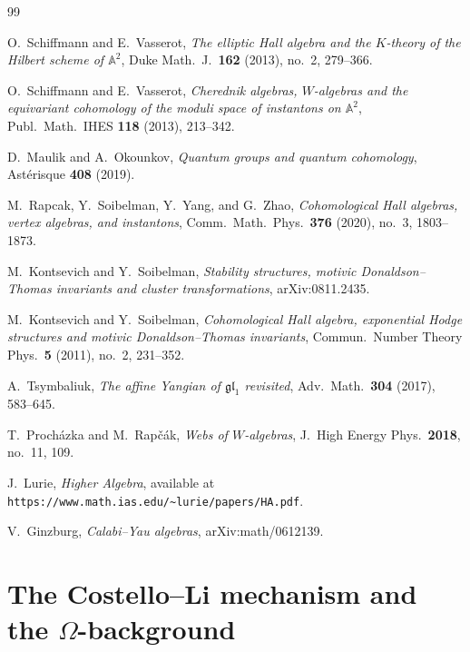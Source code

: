 \documentclass[11pt]{article}
\theoremstyle{definition}
\theoremstyle{remark}
\begin{document}

\begin{thebibliography}{99}

O.~Schiffmann and E.~Vasserot,
\emph{The elliptic Hall algebra and the $K$-theory of the Hilbert scheme of $\mathbb{A}^2$},
Duke Math.\ J.\ \textbf{162} (2013), no.~2, 279--366.

O.~Schiffmann and E.~Vasserot,
\emph{Cherednik algebras, $W$-algebras and the equivariant cohomology of the moduli space of instantons on $\mathbb{A}^2$},
Publ.\ Math.\ IHES \textbf{118} (2013), 213--342.

D.~Maulik and A.~Okounkov,
\emph{Quantum groups and quantum cohomology},
Ast\'erisque \textbf{408} (2019).

M.~Rapcak, Y.~Soibelman, Y.~Yang, and G.~Zhao,
\emph{Cohomological Hall algebras, vertex algebras, and instantons},
Comm.\ Math.\ Phys.\ \textbf{376} (2020), no.~3, 1803--1873.

M.~Kontsevich and Y.~Soibelman,
\emph{Stability structures, motivic Donaldson--Thomas invariants and cluster transformations},
arXiv:0811.2435.

M.~Kontsevich and Y.~Soibelman,
\emph{Cohomological Hall algebra, exponential Hodge structures and motivic Donaldson--Thomas invariants},
Commun.\ Number Theory Phys.\ \textbf{5} (2011), no.~2, 231--352.

A.~Tsymbaliuk,
\emph{The affine Yangian of $\mathfrak{gl}_1$ revisited},
Adv.\ Math.\ \textbf{304} (2017), 583--645.

T.~Proch\'azka and M.~Rapčák,
\emph{Webs of $W$-algebras},
J.\ High Energy Phys.\ \textbf{2018}, no.~11, 109.

J.~Lurie,
\emph{Higher Algebra},
available at \texttt{https://www.math.ias.edu/\~{}lurie/papers/HA.pdf}.

V.~Ginzburg,
\emph{Calabi--Yau algebras},
arXiv:math/0612139.

\end{thebibliography}

\appendix
\section{The Costello--Li mechanism and the $\Omega$-background}
\label{app:costello-li}
\end{document}
